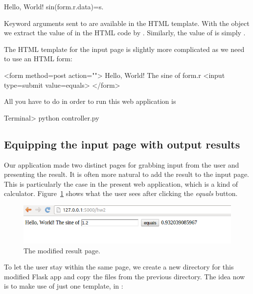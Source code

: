 \documentclass[%
oneside,                 %
final,                   %
10pt]{article}
\begin{document}
\bhtmlpro
Hello, World! sin({{form.r.data}})={{s}}.
\ehtmlpro

Keyword arguments sent to  are available in the
HTML template. With the  object we extract the value of
 in the HTML code by . Similarly, the value of 
is simply .

The HTML template for the input page is slightly more complicated
as we need to use an HTML form:

\bhtmlpro
<form method=post action="">
  Hello, World! The sine of {{form.r}}
  <input type=submit value=equals>
</form>
\ehtmlpro

All you have to do in order to run this web application is

\bsys
Terminal> python controller.py
\esys

\subsection{Equipping the input page with output results}



Our application made two distinct pages for grabbing input from the
user and presenting the result. It is often more natural to add
the result to the input page. This is particularly the case in the present
web application, which is a kind of calculator. Figure~\ref{wf:hw2:flask:fig:result} shows what the user sees after clicking the \emph{equals} button.


\begin{figure}[ht]
  \centerline{\includegraphics[width=0.9\linewidth]{fig-web4sa/hw2_flask_output.png}}
  \caption{
  The modified result page. \label{wf:hw2:flask:fig:result}
  }
\end{figure}


To let the user stay within the same page, we create a new directory 
for this modified Flask app and copy the files from the previous
 directory.  The idea now is to make use of just one
template, in :
\end{document}
